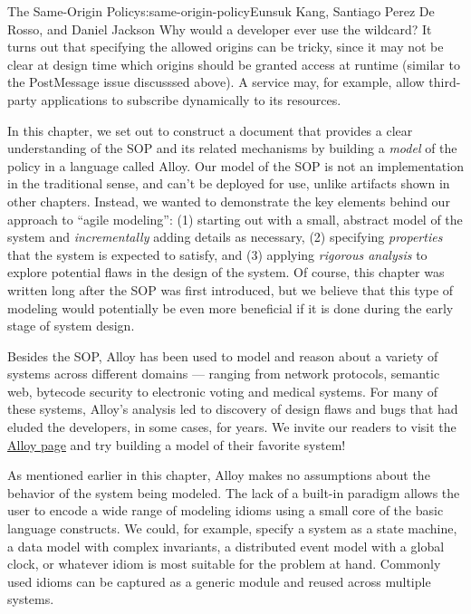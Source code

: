 \begin{aosachapter}{The Same-Origin Policy}{s:same-origin-policy}{Eunsuk Kang, Santiago Perez De Rosso, and Daniel Jackson}
Why would a developer ever use the wildcard? It turns out that
specifying the allowed origins can be tricky, since it may not be clear
at design time which origins should be granted access at runtime
(similar to the PostMessage issue discusssed above). A service may, for
example, allow third-party applications to subscribe dynamically to its
resources.

\label{conclusion}

In this chapter, we set out to construct a document that provides a
clear understanding of the SOP and its related mechanisms by building a
\emph{model} of the policy in a language called Alloy. Our model of the
SOP is not an implementation in the traditional sense, and can't be
deployed for use, unlike artifacts shown in other chapters. Instead, we
wanted to demonstrate the key elements behind our approach to ``agile
modeling'': (1) starting out with a small, abstract model of the system
and \emph{incrementally} adding details as necessary, (2) specifying
\emph{properties} that the system is expected to satisfy, and (3)
applying \emph{rigorous analysis} to explore potential flaws in the
design of the system. Of course, this chapter was written long after the
SOP was first introduced, but we believe that this type of modeling
would potentially be even more beneficial if it is done during the early
stage of system design.

Besides the SOP, Alloy has been used to model and reason about a variety
of systems across different domains --- ranging from network protocols,
semantic web, bytecode security to electronic voting and medical
systems. For many of these systems, Alloy's analysis led to discovery of
design flaws and bugs that had eluded the developers, in some cases, for
years. We invite our readers to visit the
\href{http://alloy.mit.edu}{Alloy page} and try building a model of
their favorite system!

\label{appendix-reusing-modules-in-alloy}

\label{500l.sop.appendix} As mentioned earlier in this chapter, Alloy
makes no assumptions about the behavior of the system being modeled. The
lack of a built-in paradigm allows the user to encode a wide range of
modeling idioms using a small core of the basic language constructs. We
could, for example, specify a system as a state machine, a data model
with complex invariants, a distributed event model with a global clock,
or whatever idiom is most suitable for the problem at hand. Commonly
used idioms can be captured as a generic module and reused across
multiple systems.


\end{aosachapter}
